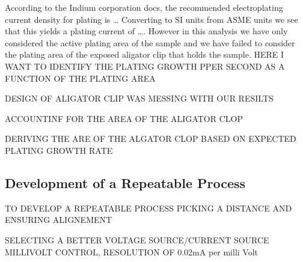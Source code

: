 According to the Indium corporation docs, the recommended electroplating current density for plating is \dots
Converting to SI units from ASME units we see that this yields a plating current of \dots . However in this analysis we have only considered the active plating area of the sample and we have failed to consider the plating area of the exposed aligator clip that holds the sample.
HERE I WANT TO IDENTIFY THE PLATING GROWTH PPER SECOND AS A FUNCTION OF THE PLATING AREA

DESIGN OF ALIGATOR CLIP WAS MESSING WITH OUR RESILTS

ACCOUNTINF FOR THE AREA OF THE ALIGATOR CLOP

DERIVING THE ARE OF THE ALGATOR CLOP BASED ON EXPECTED PLATING GROWTH RATE



\subsection{Development of a Repeatable Process}

TO DEVELOP A REPEATABLE PROCESS PICKING A DISTANCE AND ENSURING ALIGNEMENT

SELECTING A BETTER VOLTAGE SOURCE/CURRENT SOURCE MILLIVOLT CONTROL, RESOLUTION OF 0.02mA per milli Volt

